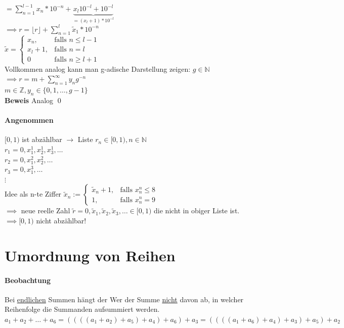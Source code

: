 \documentclass[fleqn]{scrbook}
\renewenvironment{proof}{{\bfseries Beweis }}{\qed}
\begin{document}
$=\sum_{n=1}^{l-1} x_n * 10^{-n} + \underbrace{x_l 10^{-l} + 10^{-l}}_{=(x_l + 1) * 10^{-l}}$\\
$\implies r = \lfloor r \rfloor + \sum_{n=1}^l \tilde{x}_1 * 10^{-n}$\\
$\tilde{x} = \left\{\begin{array}{cl} x_n, & \mbox{falls } n\leq l -1\\ x_l + 1, & \mbox{falls } n = l\\ 0 & \mbox{falls } n\geq l + 1 \end{array}\right. $\\
Vollkommen analog kann man g-adische Darstellung zeigen: $g \in\mathbb{N}$\\
$\implies r = m + \sum_{n=1}^\infty	y_n g^{-n}$\\
$m\in\mathbb{Z}, y_n \in\{ 0,1,\ldots ,g-1\}$\\
\begin{proof}
Analog
\end{proof}

\paragraph{Angenommen} $[0,1)$ ist abzählbar $\rightarrow$ Liste $r_n \in [0,1), n\in\mathbb{N}$\\
$r_1 = 0, x_1^1, x_2^1, x_3^1, \ldots$\\
$r_2 = 0, x_1^2, x_2^2, \ldots$\\
$r_3 = 0, x_1^3, \ldots$\\
$\vdots$\\
Idee als n-te Ziffer $\tilde{x}_n := \left\{\begin{array}{cl} \tilde{x}_n + 1, & \mbox{falls } x_n^n \leq 8\\ 1, & \mbox{falls } x_n^n = 9 \end{array}\right. $\\
$\implies$ neue reelle Zahl $\tilde{r} = 0, \tilde{x}_1, \tilde{x}_2, \tilde{x}_3, \ldots \in [0,1)$ die nicht in obiger Liste ist.
$\implies [0,1)$ nicht abzählbar!\\

\section{Umordnung von Reihen}
\paragraph{Beobachtung} Bei \underline{endlichen} Summen hängt der Wer der Summe \underline{nicht} davon ab, in welcher Reihenfolge die Summanden aufsummiert werden.\\
$a_1 + a_2 + \ldots + a_6 = ((((a_1+a_2)+a_5)+a_4)+a_6)+a_3 = ((((a_1+a_6)+a_4)+a_3)+a_5)+a_2$\\
\end{document}
